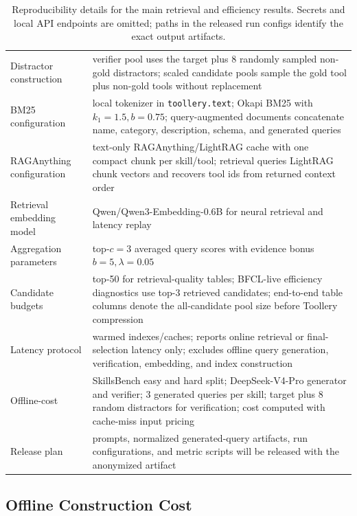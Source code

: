 \documentclass[11pt]{article}
\begin{document}
\begin{table}[t]
\begin{tabular}{p{}p{}}
Distractor construction & verifier pool uses the target plus 8 randomly sampled non-gold distractors; scaled candidate pools sample the gold tool plus non-gold tools without replacement \\
BM25 configuration & local tokenizer in \texttt{toollery.text}; Okapi BM25 with $k_1=1.5,b=0.75$; query-augmented documents concatenate name, category, description, schema, and generated queries \\
RAGAnything configuration & text-only RAGAnything/LightRAG cache with one compact chunk per skill/tool; retrieval queries LightRAG chunk vectors and recovers tool ids from returned context order \\
Retrieval embedding model & Qwen/Qwen3-Embedding-0.6B for neural retrieval and latency replay \\
Aggregation parameters & top-$c=3$ averaged query scores with evidence bonus $b=5,\lambda=0.05$ \\
Candidate budgets & top-50 for retrieval-quality tables; BFCL-live efficiency diagnostics use top-3 retrieved candidates; end-to-end table columns denote the all-candidate pool size before Toollery compression \\
Latency protocol & warmed indexes/caches; reports online retrieval or final-selection latency only; excludes offline query generation, verification, embedding, and index construction \\
Offline-cost & SkillsBench easy and hard split; DeepSeek-V4-Pro generator and verifier; 3 generated queries per skill; target plus 8 random distractors for verification; cost computed with cache-miss input pricing \\

Release plan & prompts, normalized generated-query artifacts, run configurations, and metric scripts will be released with the anonymized artifact \\
\hline
\end{tabular}
\caption{Reproducibility details for the main retrieval and efficiency results. Secrets and local API endpoints are omitted; paths in the released run configs identify the exact output artifacts.}
\label{tab:reproducibility-details}
\end{table}


\subsection{Offline Construction Cost}
\label{app:offline-construction-cost}
\end{document}
